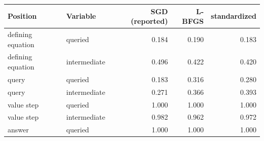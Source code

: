\begin{tabular}{@{}llrrr@{}}
\toprule
Position & Variable & SGD (reported) & L-BFGS & standardized \\
\midrule
defining equation & queried & 0.184 & 0.190 & 0.183 \\
defining equation & intermediate & 0.496 & 0.422 & 0.420 \\
query & queried & 0.183 & 0.316 & 0.280 \\
query & intermediate & 0.271 & 0.366 & 0.393 \\
value step & queried & 1.000 & 1.000 & 1.000 \\
value step & intermediate & 0.982 & 0.962 & 0.972 \\
answer & queried & 1.000 & 1.000 & 1.000 \\
\bottomrule
\end{tabular}
